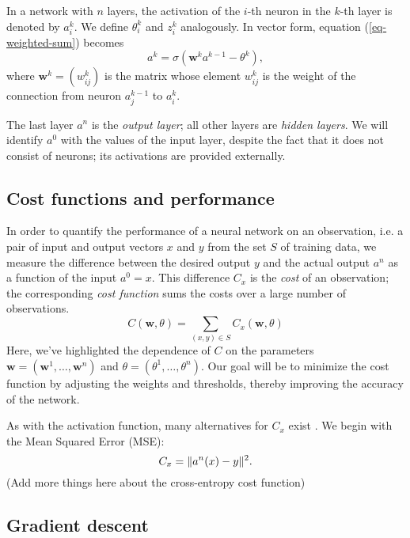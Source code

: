 \vspace{16em} %

\noindent In a network with \(n\) layers, the activation of the $i$-th neuron in the $k$-th layer is denoted by \(a_i^k\). We define \(\theta_i^k\) and \(z_i^k\) analogously. In vector form, equation (\ref{eq-weighted-sum}) becomes
\begin{equation*}
    a^k=\sigma(\mathbf{w}^k a^{k-1}-\theta^k),
\end{equation*}
where \(\mathbf{w}^k=(w_{ij}^k)\) is the matrix whose element \(w_{ij}^k\) is the weight of the connection from neuron \(a_j^{k-1}\) to \(a_i^k\). 

The last layer \(a^n\) is the \emph{output layer}; all other layers are \emph{hidden layers}. We will identify \(a^0\) with the values of the input layer, despite the fact that it does not consist of neurons; its activations are provided externally. 

\subsection{Cost functions and performance}

In order to quantify the performance of a neural network on an observation, i.e. a pair of input and output vectors \(x\) and \(y\) from the set \(S\) of training data, we measure the difference between the desired output \(y\) and the actual output \(a^n\) as a function of the input \(a^0=x\). This difference \(C_x\) is the \emph{cost} of an observation; the corresponding \emph{cost function} sums the costs over a large number of observations.  
\begin{equation*}
    C(\mathbf{w},\theta)=\sum_{(x,y)\in S} C_x(\mathbf{w}, \theta)
\end{equation*}
Here, we've highlighted the dependence of \(C\) on the parameters \(\mathbf{w}=(\mathbf{w}^1,\ldots,\mathbf{w}^n)\) and \(\theta=(\theta^1,\ldots,\theta^n)\). Our goal will be to minimize the cost function by adjusting the weights and thresholds, thereby improving the accuracy of the network.

As with the activation function, many alternatives for \(C_x\) exist \cite{TODO}. We begin with the Mean Squared Error (MSE):
\begin{equation*}
    C_x= \lVert a^n(x) - y\rVert^2.
\end{equation*}
(Add more things here about the cross-entropy cost function)

\subsection{Gradient descent}

